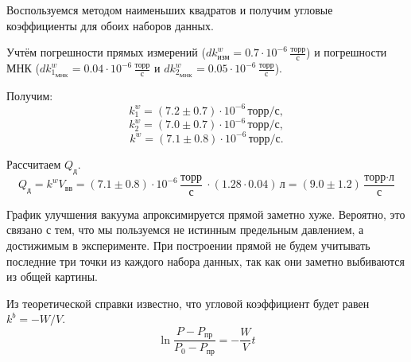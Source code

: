 \documentclass[a4paper,12pt]{article} %
\begin{document}
\begin{enumerate}
\begin{enumerate}
        Воспользуемся методом наименьших квадратов и получим угловые коэффициенты для обоих наборов данных.

        Учтём погрешности прямых измерений ($dk^w_{{\text{изм}}} = 0.7 \cdot 10^{-6} \, \frac{\text{торр}}{\text{с}}$) и погрешности МНК ($dk^w_{1_{\text{МНК}}} = 0.04 \cdot 10^{-6} \, \frac{\text{торр}}{\text{с}}$ и $dk^w_{2_{\text{МНК}}} = 0.05 \cdot 10^{-6} \, \frac{\text{торр}}{\text{с}}$). 
        
        Получим:
        \begin{equation}
          k^w_1 = (7.2 \pm 0.7) \cdot 10^{-6} \, \text{торр}/\text{с},
        \end{equation}
        \begin{equation}
          k^w_2 = (7.0 \pm 0.7) \cdot 10^{-6} \, \text{торр}/\text{с},
        \end{equation}
        \begin{equation}
          k^w = (7.1 \pm 0.8) \cdot 10^{-6} \, \text{торр}/\text{с}.
        \end{equation}
        
        Рассчитаем $Q_\text{д}$.
        \begin{equation}
          Q_\text{д} = k^w V_\text{вв} = (7.1 \pm 0.8) \cdot 10^{-6} \, \frac{\text{торр}}{\text{с}} \ \cdot (1.28 \cdot 0.04) \, \text{л} = (9.0 \pm 1.2) \, \frac{\text{торр·л}}{\text{с}}
        \end{equation}
        
        График улучшения вакуума апроксимируется прямой заметно хуже. Вероятно, это связано с тем, что мы пользуемся не истинным предельным давлением, а достижимым в эксперименте. При построении прямой не будем учитывать последние три точки из каждого набора данных, так как они заметно выбиваются из общей картины. 
        
        Из теоретической справки известно, что угловой коэффициент будет равен $k^b = -W/V$.
        \begin{equation}
          \ln\frac{P - P_{\text{пр}}}{P_0 - P_{\text{пр}}} = - \frac{W}{V} t
        \end{equation}


\end{enumerate}
\end{enumerate}
\end{document}
